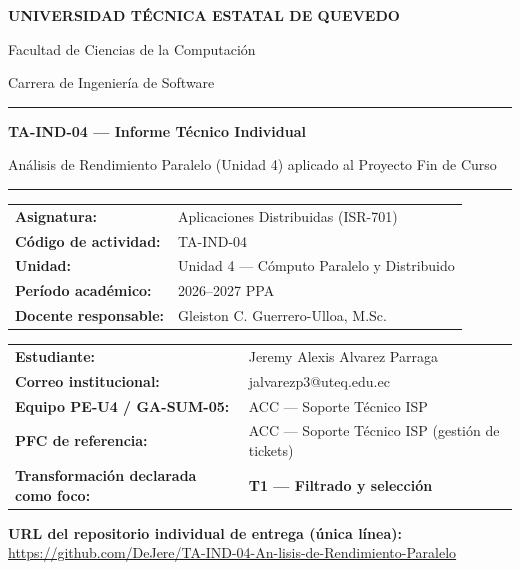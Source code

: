 \documentclass[11pt,a4paper]{article}
\begin{document}
\begin{center}
{\large\bfseries UNIVERSIDAD T\'ECNICA ESTATAL DE QUEVEDO\par}
\vspace{0.15cm}
{\normalsize Facultad de Ciencias de la Computaci\'on\par}
{\normalsize Carrera de Ingenier\'ia de Software\par}
\vspace{0.8cm}
\rule{0.85\textwidth}{0.4pt}\par
\vspace{0.5cm}
{\Large\bfseries TA-IND-04 --- Informe T\'ecnico Individual\par}
\vspace{0.2cm}
{\normalsize An\'alisis de Rendimiento Paralelo (Unidad 4) aplicado al Proyecto Fin de Curso\par}
\vspace{0.5cm}
\rule{0.85\textwidth}{0.4pt}\par
\end{center}

\vspace{0.8cm}
\begin{tabular}{ll}
\textbf{Asignatura:} & Aplicaciones Distribuidas (ISR-701) \\
\textbf{C\'odigo de actividad:} & TA-IND-04 \\
\textbf{Unidad:} & Unidad 4 --- C\'omputo Paralelo y Distribuido \\
\textbf{Per\'iodo acad\'emico:} & 2026--2027 PPA \\
\textbf{Docente responsable:} & Gleiston C. Guerrero-Ulloa, M.Sc. \\
\end{tabular}

\vspace{0.8cm}
\begin{tabular}{ll}
\textbf{Estudiante:} & Jeremy Alexis Alvarez Parraga \\
\textbf{Correo institucional:} & jalvarezp3@uteq.edu.ec \\
\textbf{Equipo PE-U4 / GA-SUM-05:} & ACC --- Soporte T\'ecnico ISP \\
\textbf{PFC de referencia:} & ACC --- Soporte T\'ecnico ISP (gesti\'on de tickets) \\
\textbf{Transformaci\'on declarada como foco:} & \textbf{T1 --- Filtrado y selecci\'on} \\
\end{tabular}

\vspace{1.0cm}
\begin{center}
\textbf{URL del repositorio individual de entrega (\'unica l\'inea):}\\[0.3cm]
\url{https://github.com/DeJere/TA-IND-04-An-lisis-de-Rendimiento-Paralelo}
\end{center}
\end{document}
